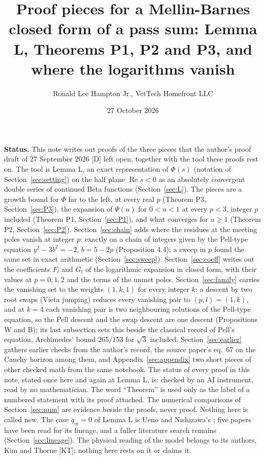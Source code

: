 \documentclass[11pt]{article}
\title{Proof pieces for a Mellin-Barnes closed form of a pass sum: Lemma L, Theorems P1, P2 and P3, and where the logarithms vanish}
\author{Ronald Lee Hampton Jr., VetTech Homefront LLC}
\date{27 October 2026}
\newcommand{\re}{\operatorname{Re}}
\begin{document}
\maketitle

\noindent\textbf{Status.} This note writes out proofs of the three pieces that the author's proof draft of 27 September 2026 [D] left open, together with the tool these proofs rest on. The tool is Lemma L, an exact representation of $\Phi(s)$ (notation of Section~\ref{sec:setting}) on the half plane $\re s<0$ as an absolutely convergent double series of continued Beta functions (Section~\ref{sec:L}). The pieces are a growth bound for $\Phi$ far to the left, at every real $p$ (Theorem P3, Section~\ref{sec:P3}), the expansion of $\Psi(u)$ for $0<u<1$ at every $p<3$, integer $p$ included (Theorem P1, Section~\ref{sec:P1}), and what converges for $u\ge1$ (Theorem P2, Section~\ref{sec:P2}). Section~\ref{sec:chain} adds where the residues at the meeting poles vanish at integer $p$: exactly on a chain of integers given by the Pell-type equation $y^2-3b^2=-2$, $b=5-2p$ (Proposition 4.4); a sweep in $p$ found the same set in exact arithmetic (Section~\ref{sec:sweep}). Section~\ref{sec:coeff} writes out the coefficients $F_l$ and $G_l$ of the logarithmic expansion in closed form, with their values at $p=0,1,2$ and the terms of the unmet poles. Section~\ref{sec:family} carries the vanishing set to the weights $(1,k,1)$ for every integer $k$: a descent by two root swaps (Vieta jumping) reduces every vanishing pair to $(p,l)=(1,k)$, and at $k=4$ each vanishing pair is two neighbouring solutions of the Pell-type equation, so the Pell descent and the swap descent are one descent (Propositions W and B); its last subsection sets this beside the classical record of Pell's equation, Archimedes' bound $265/153$ for $\sqrt3$ included. Section~\ref{sec:earlier} gathers earlier checks from the author's record, the source paper's eq.~67 on the Cauchy horizon among them, and Appendix~\ref{sec:appendix} two short pieces of other checked math from the same notebook. The status of every proof in this note, stated once here and again at Lemma L, is: checked by an AI instrument, read by no mathematician. The word ``Theorem'' is used only as the label of a numbered statement with its proof attached. The numerical comparisons of Section~\ref{sec:num} are evidence beside the proofs, never proof. Nothing here is called new. The case $q_m=0$ of Lemma L is Ueno and Nishizawa's \cite{UN}; five papers have been read for its lineage, and a fuller literature search remains (Section~\ref{sec:lineage}). The physical reading of the model belongs to its authors, Kim and Thorne [KT]; nothing here rests on it or claims it.
\end{document}
